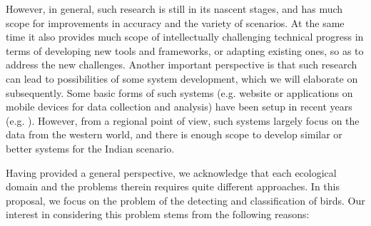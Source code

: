 \documentclass{article}
\begin{document}
However, in general, such research is still in its nascent stages, and has much
scope for improvements in accuracy and the variety of scenarios. At the same time it
also provides much scope of intellectually challenging technical progress in
terms of developing new tools and frameworks, or adapting existing ones, so as
to address the new challenges. Another important perspective is that such
research can lead to possibilities of some system development, which we will
elaborate on subsequently. Some basic forms of such systems (e.g. website or
applications on mobile devices for data collection and analysis) have been setup
in recent years (e.g. \cite{birdsnap}). However, from a regional point of view,
such systems largely focus on the data from the western world, and there is
enough scope to develop similar or better systems for the Indian scenario. 

Having provided a general perspective, we acknowledge that each ecological
domain and the problems therein requires quite different approaches. In this
proposal, we focus on the problem of the detecting and classification of birds.
Our interest in considering this problem stems from the following reasons: 
\end{document}
